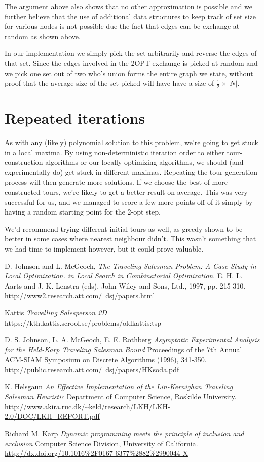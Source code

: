 \documentclass[a4paper,12pt,oneside]{article}
\begin{document}
The argument above also shows that no other approximation is possible and we further believe that the use of additional data structures to keep track of set size for various nodes is not possible due the fact that edges can be exchange at random as shown above.

In our implementation we simply pick the set arbitrarily and reverse the edges of that set. Since the edges involved in the 2OPT exchange is picked at random and we pick one set out of two who's union forms the entire graph we state, without proof that the average size of the set picked will have have a size of $\frac{1}{2} \times |N|$.


\section{Repeated iterations}

As with any (likely) polynomial solution to this problem, we're going to get stuck in a local maxima. By using non-deterministic iteration order to either tour-construction algorithms or our locally optimizing algorithms, we should (and experimentally do) get stuck in different maximas. Repeating the tour-generation process will then generate more solutions. If we choose the best of more constructed tours, we're likely to get a better result on average. This was very successful for us, and we managed to score a few more points off of it simply by having a random starting point for the 2-opt step.

We'd recommend trying different initial tours as well, as greedy shown to be better in some cases where nearest neighbour didn't. This wasn't something that we had time to implement however, but it could prove valuable.

\begin{thebibliography}{9}

	D. Johnson and L. McGeoch,
	\emph{The Traveling Salesman Problem: A Case Study in Local Optimization. in Local Search in Combinatorial Optimization}.
	E. H. L. Aarts and J. K. Lenstra (eds), John Wiley and Sons, Ltd., 1997, pp. 215-310. http://www2.research.att.com/~dsj/papers.html

	Kattis
	\emph{Travelling Salesperson 2D}
	https://kth.kattis.scrool.se/problems/oldkattis:tsp

	D. S. Johnson, L. A. McGeoch, E. E. Rothberg
	\emph{Asymptotic Experimental Analysis for the Held-Karp Traveling Salesman Bound}
	Proceedings of the 7th Annual ACM-SIAM Symposium on Discrete Algorithms (1996), 341-350. http://public.research.att.com/~dsj/papers/HKsoda.pdf

	K. Helsgaun
	\emph{An Effective Implementation of the Lin-Kernighan Traveling Salesman Heuristic}
	Department of Computer Science, Roskilde University. \url{http://www.akira.ruc.dk/~keld/research/LKH/LKH-2.0/DOC/LKH_REPORT.pdf}
\end{thebibliography}

	Richard M. Karp
	\emph{Dynamic programming meets the principle of inclusion and exclusion}
	Computer Science Division, University of California. \url{http://dx.doi.org/10.1016%2F0167-6377%2882%2990044-X}
\end{document}
